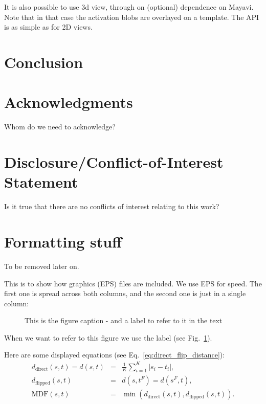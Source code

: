 \documentclass{bioinfo}
\begin{document}
It is also possible to use 3d view, through on (optional) dependence
on Mayavi. Note that in that case the activation blobs are overlayed
on a template.
%
The API is as simple as for 2D views.


\section{Conclusion}


\section*{Acknowledgments}
Whom do we need to acknowledge?

\section*{Disclosure/Conflict-of-Interest Statement}
Is it true that there are no conflicts of interest relating to this
work?


\section*{Formatting stuff}

To be removed later on.

This is to show how graphics (EPS) files are included. We use EPS for
speed. The first one is spread across both columns, and the second one
is just in a single column:

\begin{figure}
\caption{This is the figure caption - and a label to refer to it in the text \label{Fig:big_picture}}

\end{figure}

When we want to refer to this figure we use the label (see
Fig.~\ref{Fig:big_picture}).


Here are some displayed equations (see Eq.~\ref{eq:direct_flip_distance}):
\begin{eqnarray}
  d_{\textrm{direct}}(s, t) = d(s, t) & = & \frac{1}{K}\sum_{i=1}^{K}|s_{i}-t_{i}|,\nonumber\\
  d_{\textrm{flipped}}(s, t) & = & d(s,t^F) = d(s^F,t),\nonumber\\
  \textrm{MDF}(s, t) & = & \min(d_{\textrm{direct}}(s, t), d_{\textrm{flipped}}(s, t))\label{eq:direct_flip_distance}.
\end{eqnarray}
\end{document}
